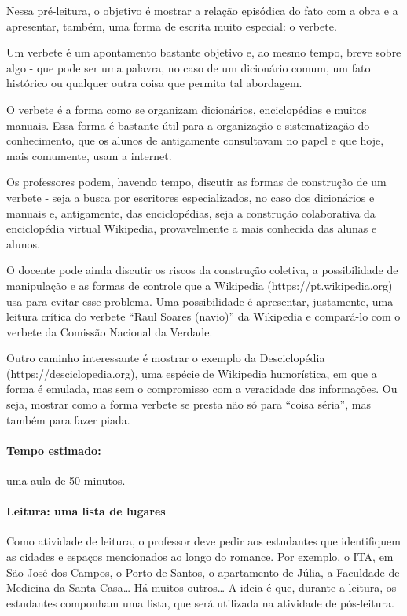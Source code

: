 \documentclass[12pt]{extarticle}
\begin{document}
Nessa pré-leitura, o objetivo é mostrar a relação episódica do fato com
a obra e a apresentar, também, uma forma de escrita muito especial: o
verbete.

Um verbete é um apontamento bastante objetivo e, ao mesmo tempo, breve
sobre algo - que pode ser uma palavra, no caso de um dicionário comum,
um fato histórico ou qualquer outra coisa que permita tal abordagem.

O verbete é a forma como se organizam dicionários, enciclopédias e
muitos manuais. Essa forma é bastante útil para a organização e
sistematização do conhecimento, que os alunos de antigamente consultavam
no papel e que hoje, mais comumente, usam a internet.

Os professores podem, havendo tempo, discutir as formas de construção de
um verbete - seja a busca por escritores especializados, no caso dos
dicionários e manuais e, antigamente, das enciclopédias, seja a
construção colaborativa da enciclopédia virtual Wikipedia, provavelmente
a mais conhecida das alunas e alunos.

O docente pode ainda discutir os riscos da construção coletiva, a
possibilidade de manipulação e as formas de controle que a Wikipedia
(https://pt.wikipedia.org) usa para evitar esse problema. Uma
possibilidade é apresentar, justamente, uma leitura crítica do verbete
``Raul Soares (navio)'' da Wikipedia e compará-lo com o verbete da
Comissão Nacional da Verdade.

Outro caminho interessante é mostrar o exemplo da Desciclopédia
(https://desciclopedia.org), uma espécie de Wikipedia humorística, em
que a forma é emulada, mas sem o compromisso com a veracidade das
informações. Ou seja, mostrar como a forma verbete se presta não só para
``coisa séria'', mas também para fazer piada.

\paragraph{Tempo estimado:} uma aula de 50 minutos.

\paragraph{Leitura: uma lista de lugares}

Como atividade de leitura, o professor deve pedir aos estudantes que
identifiquem as cidades e espaços mencionados ao longo do romance. Por
exemplo, o ITA, em São José dos Campos, o Porto de Santos, o apartamento
de Júlia, a Faculdade de Medicina da Santa Casa\ldots{} Há muitos
outros\ldots{} A ideia é que, durante a leitura, os estudantes componham
uma lista, que será utilizada na atividade de pós-leitura.
\end{document}
